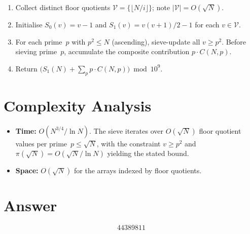 \documentclass[11pt]{article}
\begin{document}
\begin{enumerate}
    \item Collect distinct floor quotients $\mathcal{V} = \{\lfloor N/i\rfloor\}$; note $|\mathcal{V}| = O(\sqrt{N})$.
    \item Initialise $S_0(v) = v-1$ and $S_1(v) = v(v+1)/2 - 1$ for each $v \in \mathcal{V}$.
    \item For each prime~$p$ with $p^2 \le N$ (ascending), sieve-update all $v \ge p^2$.  Before sieving prime~$p$, accumulate the composite contribution $p \cdot C(N,p)$.
    \item Return $\bigl(S_1(N) + \sum_p p \cdot C(N,p)\bigr) \bmod 10^9$.
\end{enumerate}

\section{Complexity Analysis}
\begin{itemize}
    \item \textbf{Time:} $O(N^{3/4}/\ln N)$.  The sieve iterates over $O(\sqrt{N})$ floor quotient values per prime~$p \le \sqrt{N}$, with the constraint $v \ge p^2$ and $\pi(\sqrt{N}) = O(\sqrt{N}/\ln N)$ yielding the stated bound.
    \item \textbf{Space:} $O(\sqrt{N})$ for the arrays indexed by floor quotients.
\end{itemize}

\section{Answer}

\[
\boxed{44389811}
\]
\end{document}
